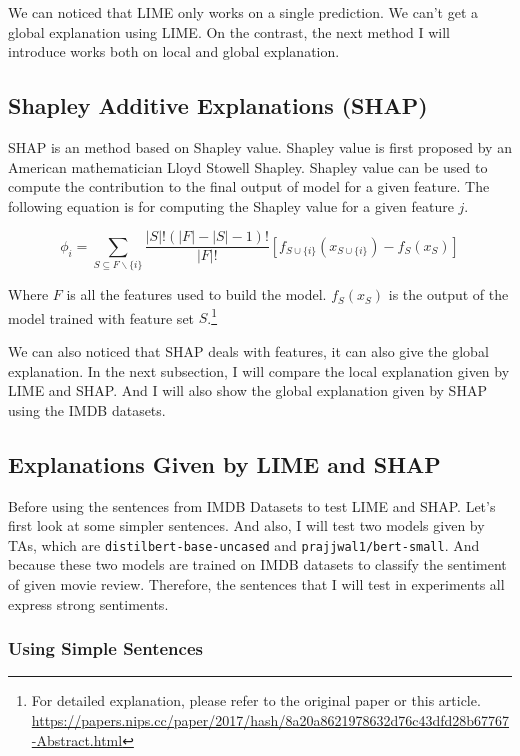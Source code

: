 \documentclass{article}[12pt]
\begin{document}
We can noticed that LIME only works on a single prediction. We can't get a global explanation using LIME. On the contrast, the next method I will introduce works both on local and global explanation.

\subsection{Shapley Additive Explanations (SHAP)}

SHAP is an method based on Shapley value. Shapley value is first proposed by an American mathematician Lloyd Stowell Shapley. Shapley value can be used to compute the contribution to the final output of model for a given feature. The following equation is for computing the Shapley value for a given feature $j$.

\begin{equation}
\phi_{i}=\sum_{S \subseteq F \backslash\{i\}} \frac{|S| !(|F|-|S|-1) !}{|F| !}\left[f_{S \cup\{i\}}\left(x_{S \cup\{i\}}\right)-f_{S}\left(x_{S}\right)\right]
\end{equation}

Where $F$ is all the features used to build the model. $f_{S}(x_{S})$ is the output of the model trained with feature set $S$.\footnote{For detailed explanation, please refer to the original paper or this article. \url{https://papers.nips.cc/paper/2017/hash/8a20a8621978632d76c43dfd28b67767-Abstract.html}}

We can also noticed that SHAP deals with features, it can also give the global explanation. In the next subsection, I will compare the local explanation given by LIME and SHAP. And I will also show the global explanation given by SHAP using the IMDB datasets.

\subsection{Explanations Given by LIME and SHAP}

Before using the sentences from IMDB Datasets to test LIME and SHAP. Let's first look at some simpler sentences. And also, I will test two models given by TAs, which are \texttt{distilbert-base-uncased} and \texttt{prajjwal1/bert-small}. And because these two models are trained on IMDB datasets to classify the sentiment of given movie review. Therefore, the sentences that I will test in experiments all express strong sentiments.

\subsubsection{Using Simple Sentences}
\end{document}
